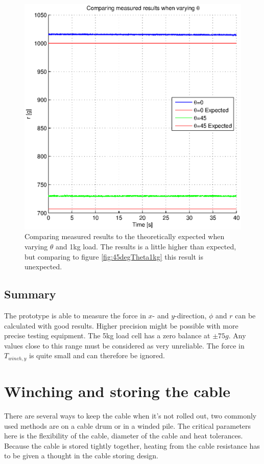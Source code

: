 \begin{figure}[hbtp]
\centering
\includegraphics[scale=1]{graphics/gcs_test/Theta1kgCable.eps}
\caption[Comparing measured results to the theoretically expected, $\theta$ variable]{Comparing measured results to the theoretically expected when varying $\theta$ and 1kg load. The results is a little higher than expected, but comparing to figure \ref{fig:45degTheta1kg} this result is unexpected.}
\end{figure}




\subsection{Summary}
The prototype is able to measure the force in $x$- and $y$-direction, $\phi$ and $r$ can be calculated with good results. Higher precision might be possible with more precise testing equipment.
The 5kg load cell has a zero balance at $\pm75g$. Any values close to this range must be considered as very unreliable. 
The force in $T_{winch,y}$ is quite small and can therefore be ignored.




\section{Winching and storing the cable}
There are several ways to keep the cable when it's not rolled out, two commonly used methods are on a cable drum or in a winded pile. The critical parameters here is the flexibility of the cable, diameter of the cable and heat tolerances.  Because the cable is stored tightly together, heating from the cable resistance has to be given a thought in the cable storing design.

